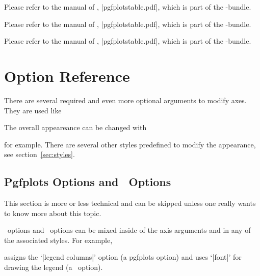 \begin{command}{\pgfplotstableread{}}
	Please refer to the manual of \PGFPlotstable, |pgfplotstable.pdf|, which is part of the \PGFPlots-bundle.
\end{command}
\begin{command}{\pgfplotstabletypeset{}}
	Please refer to the manual of \PGFPlotstable, |pgfplotstable.pdf|, which is part of the \PGFPlots-bundle.
\end{command}
\begin{command}{\pgfplotstabletypesetfile{}}
	Please refer to the manual of \PGFPlotstable, |pgfplotstable.pdf|, which is part of the \PGFPlots-bundle.
\end{command}

\section{Option Reference}
There are several required and even more optional arguments to modify axes. They are used like
\begin{codeexample}
\end{codeexample}
\noindent
The overall appeareance can be changed with
\begin{codeexample}
\end{codeexample}
\noindent
for example. There are several other styles predefined to modify the appearance, see section~\ref{sec:styles}.

\subsection{Pgfplots Options and \Tikz\ Options}
This section is more or less technical and can be skipped unless one really wants to know more about this topic.

\Tikz\ options and \PGFPlots\ options can be mixed inside of the axis arguments and in any of the associated styles. For example,
\begin{codeexample}
\end{codeexample}
\noindent
assigns the `|legend columns|' option (a pgfplots option) and uses `|font|' for drawing the legend (a \Tikz\ option).

